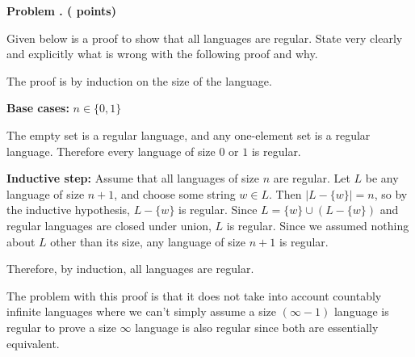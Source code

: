




\newpage
\addtocounter{problemctr}{1}
\noindent
{\bf
Problem \theproblemctr.  (\thealllanguagesregular \xspace points)}
\swallow{ (\thealllanguagesregulartime\xspace minutes)}

\smallskip

\noindent
Given below is a proof to show that all languages are regular. State very
clearly and explicitly what is wrong with the following proof and why.
\bigskip\bigskip

The proof is by induction on the size of the language.

\bigskip

{\bf Base cases:} $n \in \{ 0, 1 \}$

The empty set is a regular language, and any one-element set is a regular language. Therefore every language of size $0$ or $1$ is regular.

\bigskip

{\bf Inductive step:} Assume that all languages of size $n$ are regular. Let $L$ be any language of size $n+1$, and choose some string $w \in L$. Then $|L-\{w\}| = n$, so by the inductive hypothesis, $L-\{w\}$ is regular. Since $L = \{w\} \cup (L-\{w\})$ and regular languages are closed under union, $L$ is regular. Since we assumed nothing about $L$ other than its size, any language of size $n+1$ is regular.

\bigskip

Therefore, by induction, all languages are regular.

\bigskip

The problem with this proof is that it does not take into account countably infinite languages where we can't simply assume a size $(\infty-1)$ language is regular to prove a size $\infty$ language is also regular since both are essentially equivalent.